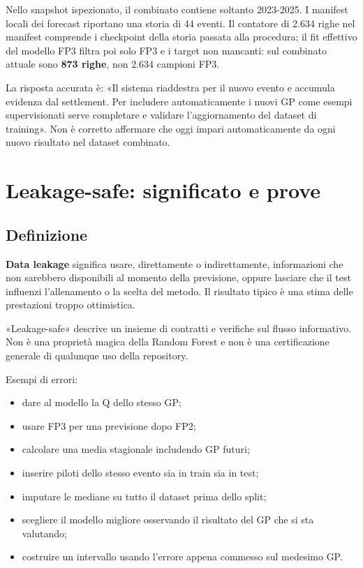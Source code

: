 \documentclass[11pt,a4paper]{article}
\providecommand{\tightlist}{\setlength{\itemsep}{0pt}\setlength{\parskip}{0pt}}
\begin{document}
Nello snapshot ispezionato, il combinato contiene soltanto 2023-2025. I manifest locali dei forecast riportano una storia di 44 eventi. Il contatore di 2.634 righe nel manifest comprende i checkpoint della storia passata alla procedura; il fit effettivo del modello FP3 filtra poi solo FP3 e i target non mancanti: sul combinato attuale sono \textbf{873 righe}, non 2.634 campioni FP3.

La risposta accurata è: «Il sistema riaddestra per il nuovo evento e accumula evidenza dal settlement. Per includere automaticamente i nuovi GP come esempi supervisionati serve completare e validare l'aggiornamento del dataset di training». Non è corretto affermare che oggi impari automaticamente da ogni nuovo risultato nel dataset combinato.

\section{Leakage-safe: significato e prove}\label{leakage-safe-significato-e-prove}

\subsection{Definizione}\label{definizione}

\textbf{Data leakage} significa usare, direttamente o indirettamente, informazioni che non sarebbero disponibili al momento della previsione, oppure lasciare che il test influenzi l'allenamento o la scelta del metodo. Il risultato tipico è una stima delle prestazioni troppo ottimistica.

«Leakage-safe» descrive un insieme di contratti e verifiche sul flusso informativo. Non è una proprietà magica della Random Forest e non è una certificazione generale di qualunque uso della repository.

Esempi di errori:

\begin{itemize}
\tightlist
\item
  dare al modello la Q dello stesso GP;
\item
  usare FP3 per una previsione dopo FP2;
\item
  calcolare una media stagionale includendo GP futuri;
\item
  inserire piloti dello stesso evento sia in train sia in test;
\item
  imputare le mediane su tutto il dataset prima dello split;
\item
  scegliere il modello migliore osservando il risultato del GP che si sta valutando;
\item
  costruire un intervallo usando l'errore appena commesso sul medesimo GP.
\end{itemize}
\end{document}
